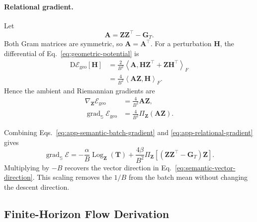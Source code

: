 \paragraph{Relational gradient.}
Let
\begin{equation}
    \mathbf{A}
    =
    \mathbf{Z}\mathbf{Z}^\top-\mathbf{G}_T.
\end{equation}
Both Gram matrices are symmetric, so $\mathbf{A}=\mathbf{A}^\top$. For a
perturbation $\mathbf{H}$, the differential of
Eq.~\ref{eq:geometric-potential} is
\begin{align}
    \mathrm{D}\mathcal{E}_{\mathrm{geo}}[\mathbf{H}]
    &=
    \frac{2}{B^2}
    \left\langle
        \mathbf{A},
        \mathbf{H}\mathbf{Z}^\top
        +
        \mathbf{Z}\mathbf{H}^\top
    \right\rangle_F
    \nonumber\\
    &=
    \frac{4}{B^2}
    \left\langle
        \mathbf{A}\mathbf{Z},
        \mathbf{H}
    \right\rangle_F.
    \label{eq:app-relational-differential}
\end{align}
Hence the ambient and Riemannian gradients are
\begin{align}
    \nabla_{\mathbf{Z}}\mathcal{E}_{\mathrm{geo}}
    &=
    \frac{4}{B^2}
    \mathbf{A}\mathbf{Z},
    \nonumber\\
    \operatorname{grad}_{\mathbb{S}}
    \mathcal{E}_{\mathrm{geo}}
    &=
    \frac{4}{B^2}
    \Pi_{\mathbf{Z}}(\mathbf{A}\mathbf{Z}).
    \label{eq:app-relational-gradient}
\end{align}

Combining Eqs.~\ref{eq:app-semantic-batch-gradient} and
\ref{eq:app-relational-gradient} gives
\begin{equation}
    \operatorname{grad}_{\mathbb{S}}\mathcal{E}
    =
    -\frac{\alpha}{B}
    \operatorname{Log}_{\mathbf{Z}}(\mathbf{T})
    +
    \frac{4\beta}{B^2}
    \Pi_{\mathbf{Z}}
    \!\left[
        (\mathbf{Z}\mathbf{Z}^\top-\mathbf{G}_T)\mathbf{Z}
    \right].
    \label{eq:app-total-riemannian-gradient}
\end{equation}
Multiplying by $-B$ recovers the vector direction in
Eq.~\ref{eq:semantic-vector-direction}. This scaling removes the $1/B$ from
the batch mean without changing the descent direction.

\subsection{Finite-Horizon Flow Derivation}
\label{app:finite-horizon-derivation}

